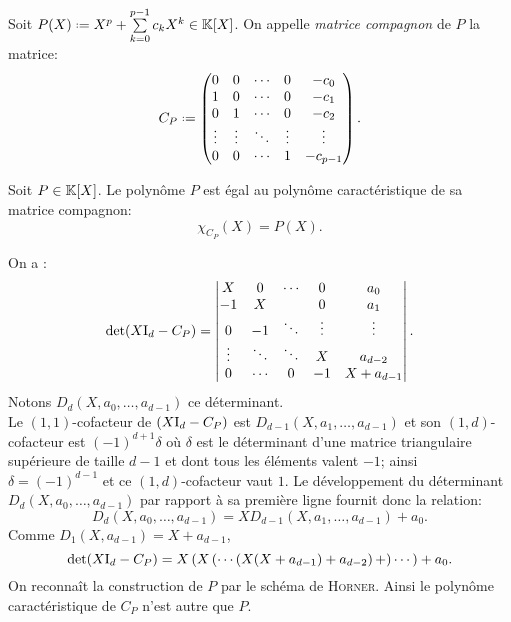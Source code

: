 \begin{defi}
    Soit $P(X) \defeq X^p + \sum\limits_{k=0}^{p-1} c_kX^k \in \K[X]$. On appelle \emph{matrice compagnon} de $P$ la matrice:
$$ C_P \defeq
\begin{pmatrix}
0 & 0 & \cdots & 0 & -c_0\\
1 & 0 & \cdots & 0 & -c_1\\
0 & 1 & \cdots & 0 & -c_2\\
\vdots & \vdots & \ddots & \vdots & \vdots\\
0 & 0 & \cdots & 1 & -c_{p-1}
\end{pmatrix}.
$$
\end{defi}

\begin{theo}
    Soit $P \in \mathbb{K}[X]$. Le polynôme $P$ est égal au polynôme caractéristique de sa matrice compagnon:
    $$\chi_{C_P}(X) = P(X).$$
\end{theo}    

\begin{preuve}
    On a :
    $$
    \det(X \mathrm{I}_d - C_P) = 
    \begin{vmatrix}
        X & 0 & \cdots & 0 & a_0 \\
        -1 & X & & 0 & a_1 \\
        0 & -1 & \ddots & \vdots & \vdots \\
        \vdots & \ddots & \ddots & X & a_{d-2} \\
        0 & \cdots & 0 & -1 & X + a_{d-1}
    \end{vmatrix}.
    $$
    Notons $D_d(X, a_0, \dots, a_{d-1})$ ce déterminant. \\
    Le $(1,1)$-cofacteur de $(X \mathrm{I}_d - C_P)$ est $D_{d-1}(X, a_1, \dots, a_{d-1})$ et son $(1,d)$-cofacteur est $(-1)^{d+1} \delta$ où $\delta$ est le déterminant d'une matrice triangulaire supérieure de taille $d-1$ et dont tous les éléments valent $-1$; ainsi $\delta = (-1)^{d-1}$ et ce $(1,d)$-cofacteur vaut $1$. Le développement du déterminant $D_d(X, a_0, \dots, a_{d-1})$ par rapport à sa première ligne fournit donc la relation:
    $$D_d(X, a_0, \dots, a_{d-1}) = X D_{d-1}(X, a_1, \dots, a_{d-1}) + a_0.$$
    Comme $D_1(X, a_{d-1}) = X + a_{d-1}$,
    $$\det(X \mathrm{I}_d - C_P) = X \left(X \left(\cdots \left(X(X+a_{d-1}) + a_{d-2} \right) + \right) \cdots \right) + a_0.$$
    On reconnaît la construction de $P$ par le schéma de \textsc{Horner}. Ainsi le polynôme caractéristique de $C_P$ n'est autre que $P$. 
\end{preuve} 

